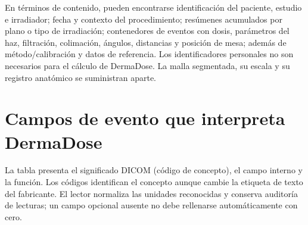 En términos de contenido, pueden encontrarse identificación del paciente, estudio e irradiador; fecha y contexto del procedimiento; resúmenes acumulados por plano o tipo de irradiación; contenedores de eventos con dosis, parámetros del haz, filtración, colimación, ángulos, distancias y posición de mesa; además de método/calibración y datos de referencia. Los identificadores personales no son necesarios para el cálculo de DermaDose. La malla segmentada, su escala y su registro anatómico se suministran aparte.

\section{Campos de evento que interpreta DermaDose}
La tabla presenta el significado DICOM (código de concepto), el campo interno y la función. Los códigos identifican el concepto aunque cambie la etiqueta de texto del fabricante. El lector normaliza las unidades reconocidas y conserva auditoría de lecturas; un campo opcional ausente no debe rellenarse automáticamente con cero.
